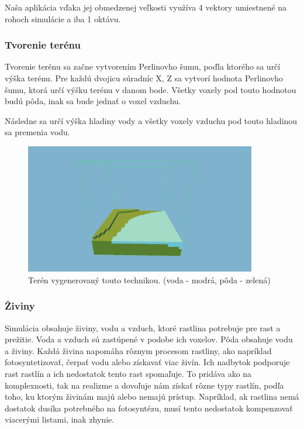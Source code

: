 \documentclass[12pt]{article}
\begin{document}
Naša aplikácia vďaka jej obmedzenej veľkosti využíva 4 vektory umiestnené
na rohoch simulácie a iba 1 oktávu.

\subsubsection{Tvorenie terénu}

Tvorenie terénu sa začne vytvorením Perlinovho šumu, poďla ktorého sa určí výška terénu.
Pre každú dvojicu súradníc X, Z sa vytvorí hodnota Perlinovho šumu, ktorá určí
výšku terénu v danom bode. Všetky voxely pod touto hodnotou budú pôda, inak
sa bude jednať o voxel vzduchu.

Následne sa určí výška hladiny vody a všetky voxely vzduchu pod touto hladinou
sa premenia vodu.

\begin{figure}[ht]
	\centering
	\includegraphics[width=0.9\textwidth]{res/terrain.png}
	\caption{Terén vygenerovaný touto technikou. (voda - modrá, pôda - zelená)}
\end{figure}

\newpage
\subsubsection{Živiny}

Simulácia obsahuje živiny, vodu a vzduch, ktoré rastlina potrebuje pre rast a prežitie.
Voda a vzduch sú zastúpené v podobe ich voxelov. Pôda obsahuje vodu a živiny.
Každá živina napomáha rôznym procesom rastliny, ako napríklad fotosyntetizovať,
čerpať vodu alebo získavať viac živín. Ich nadbytok podporuje rast rastlín
a ich nedostatok tento rast spomaľuje. To pridáva ako na komplexnosti,
tak na realizme a dovoľuje nám získať rôzne typy rastlín, podľa toho,
ku ktorým živinám majú alebo nemajú prístup. Napríklad, ak rastlina nemá dostatok dusíka
potrebného na fotosyntézu, musí tento nedostatok kompenzovať viacerými listami, inak zhynie.
\end{document}
